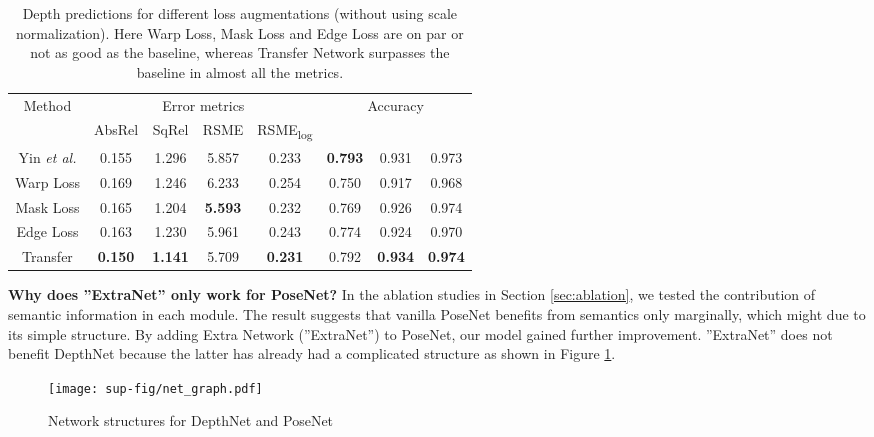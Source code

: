 \documentclass[10pt,twocolumn]{article}
\begin{document}
\begin{table}[!htbp]
\vspace*{3pt}
\centering

\begin{tabular}{c|cccc|ccc}
 \hline
  \multirow{2}{*}{Method} & \multicolumn{4}{c|}{Error metrics} & \multicolumn{3}{c}{Accuracy }\\
  
  & AbsRel & SqRel & RSME & RSME\textsubscript{log} &  &  & \\

   
 \hline
  Yin \textit{et al.}\cite{yin2018geonet}  &   0.155 & 1.296 & 5.857 & 0.233 & \textbf{0.793} & 0.931 & 0.973 \\
  Warp Loss   & 0.169 & 1.246 & 6.233 & 0.254 & 0.750 & 0.917 & 0.968 \\
  Mask Loss   & 0.165 & 1.204 & \textbf{5.593} & 0.232 & 0.769 & 0.926 &  0.974 \\
  Edge Loss   & 0.163 & 1.230 & 5.961 & 0.243 & 0.774 & 0.924 & 0.970 \\ 
  Transfer    & \textbf{0.150} & \textbf{1.141} & 5.709 & \textbf{0.231} & 0.792 & \textbf{0.934} & \textbf{0.974} \\
 \hline
\end{tabular}
\vspace*{1pt}
\caption{Depth predictions for different loss augmentations (without using scale normalization). Here Warp Loss, Mask Loss and Edge Loss are on par or not as good as the baseline, whereas Transfer Network surpasses the baseline in almost all the metrics.}
\label{tab:miss_exp}
\end{table}

\noindent \textbf{Why does ”ExtraNet” only work for PoseNet?}
In the ablation studies in Section \ref{sec:ablation}, we tested the contribution of semantic information in each module. The result suggests that vanilla PoseNet benefits from  semantics  only  marginally,  which  might  due  to  its simple  structure. By adding Extra  Network (”ExtraNet”) to PoseNet, our model gained further improvement. ”ExtraNet” does not benefit DepthNet because the latter has already had a complicated structure as shown in Figure \ref{fig:network_comp}. \\

\begin{figure}[!htbp]
\begin{center}
   \texttt{[image: sup-fig/net\_graph.pdf]}
\end{center}
\vspace*{-12pt}
   \caption{Network structures for DepthNet and PoseNet}
\label{fig:network_comp}
\vspace*{4pt}
\end{figure}
\end{document}
